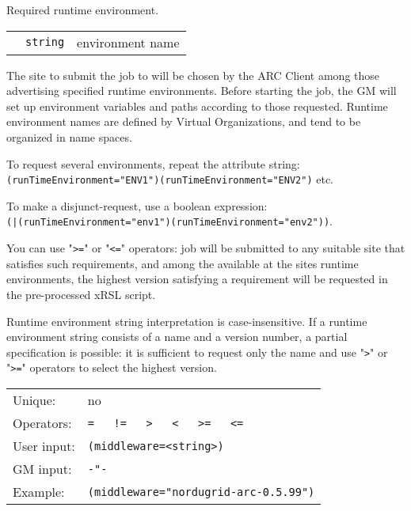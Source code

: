   Required runtime environment.

  \begin{tabular}{llp{10cm}}
    \hspace*{1cm}&\texttt{string} & environment name\\
  \end{tabular}

  The site to submit the job to will be chosen by the ARC Client among those
  advertising specified runtime environments. Before starting the job,
  the GM will set up environment variables and paths according to
  those requested. Runtime environment names are defined by Virtual 
  Organizations, and tend to be organized in name spaces.

  To request several environments, repeat the attribute string:\\
  \verb#(runTimeEnvironment="ENV1")(runTimeEnvironment="ENV2")# etc.   

  To make a disjunct-request, use a boolean expression:\\
  \verb#(|(runTimeEnvironment="env1")(runTimeEnvironment="env2"))#.

  You can use "\verb#>=#" or "\verb#<=#" operators: job will be submitted to
  any suitable site that satisfies such requirements, and among the available at the sites
  runtime environments, the highest version satisfying a requirement will be requested
  in the pre-processed xRSL script.

  Runtime environment string interpretation is
  case-insensitive.  If a runtime environment string consists of a name
  and a version number, a partial specification is possible: it is sufficient
  to request only the name and use "\verb#>#" or "\verb#>=#" operators to select the highest version.

  \hspace*{0.5cm}
  \begin{shaded}
  \end{shaded}
  \begin{tabular}{lp{13cm}}
    Unique:&no\\
    Operators:&\verb#=   !=   >   <   >=   <=#\\
    User input:&\verb#(middleware=<string>)#\\
    GM input:&\verb#-"-#\\
    Example:&\verb#(middleware="nordugrid-arc-0.5.99")#\\
  \end{tabular}

